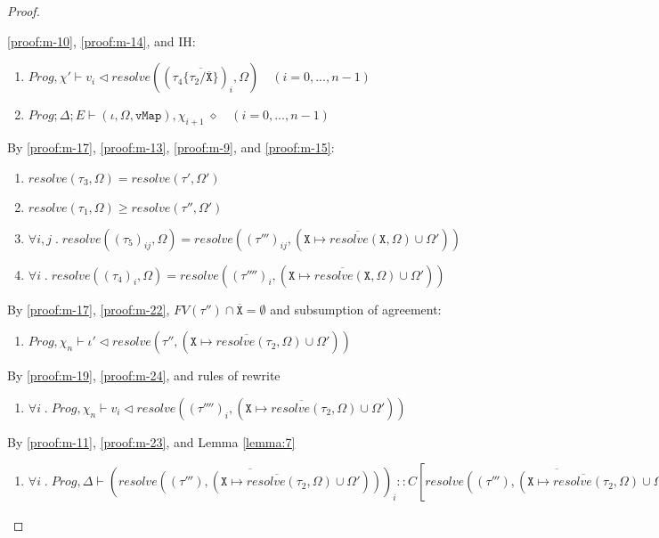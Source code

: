 \begin{proof}
\begin{enumerate}[label=\arabic*), resume]
\end{enumerate}
\ref{proof:m-10}, \ref{proof:m-14}, and IH:
\begin{enumerate}[label=\arabic*), resume]
    \item \label{proof:m-19} $Prog, \chi' \vdash v_i \triangleleft resolve((\tau_4\{\overline{\tau_2/\overline{\texttt{X}}}\})_i, \Omega) \quad (i = 0, ..., n-1)$ 
    \item \label{proof:m-20} $Prog; \Delta; E \vdash (\iota, \Omega, \texttt{vMap}), \chi_{i+1} \; \diamond \quad (i = 0, ..., n-1)$ 
\end{enumerate}
By \ref{proof:m-17}, \ref{proof:m-13}, \ref{proof:m-9}, and \ref{proof:m-15}:
\begin{enumerate}[label=\arabic*), resume]
    \item \label{proof:m-21} $resolve(\tau_3, \Omega) = resolve(\tau', \Omega')$
    \item \label{proof:m-22} $resolve(\tau_1, \Omega) \geq resolve(\tau'', \Omega')$
    \item \label{proof:m-23} $\forall i, j \; . \; resolve((\tau_5)_{ij}, \Omega) = resolve((\tau''')_{ij}, (\overline{\texttt{X} \mapsto resolve(\texttt{X}, \Omega)} \cup \Omega'))$
    \item \label{proof:m-24} $\forall i \; . \; resolve((\tau_4)_i, \Omega) = resolve((\tau'''')_i, (\overline{\texttt{X} \mapsto resolve(\texttt{X}, \Omega)} \cup \Omega'))$
\end{enumerate}
By \ref{proof:m-17}, \ref{proof:m-22}, $FV(\tau'') \cap \overline{\texttt{X}} = \emptyset$ and subsumption of agreement:
\begin{enumerate}[label=\arabic*), resume]
    \item \label{proof:m-25} $Prog, \chi_n \vdash \iota' \triangleleft resolve(\tau'', (\overline{\texttt{X} \mapsto resolve(\tau_2, \Omega)} \cup \Omega'))$
\end{enumerate}
By \ref{proof:m-19}, \ref{proof:m-24}, and rules of rewrite
\begin{enumerate}[label=\arabic*), resume]
    \item \label{proof:m-26} $\forall i \; . \; Prog, \chi_n \vdash v_i \triangleleft resolve((\tau'''')_i, (\overline{\texttt{X} \mapsto resolve(\tau_2, \Omega)} \cup \Omega'))$
\end{enumerate}
By \ref{proof:m-11}, \ref{proof:m-23}, and Lemma \ref{lemma:7}
\begin{enumerate}[label=\arabic*), resume]
    \item \label{proof:m-27} $\forall i \; . \; Prog, \Delta \vdash (\overline{resolve((\tau'''), (\overline{\texttt{X} \mapsto resolve(\tau_2, \Omega)} \cup \Omega'))})_i :: C[\overline{resolve((\tau'''), (\overline{\texttt{X} \mapsto resolve(\tau_2, \Omega)} \cup \Omega'))}]_i$

\end{enumerate}
\end{proof}
